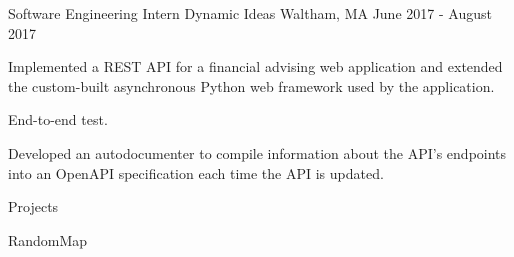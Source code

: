 

\begin{cventries}

  \cventry
    {Software Engineering Intern} %
    {Dynamic Ideas} %
    {Waltham, MA} %
    {June 2017 - August 2017} %
    {
      \begin{cvitems} %
        \item {Implemented a REST API for a financial advising web application
          and extended the custom-built asynchronous Python web framework used
          by the application.}
        \item {End-to-end test.}
        \item {Developed an autodocumenter to compile information about the API's endpoints into an OpenAPI specification each time the API is updated.}
      \end{cvitems}
    }

    \cventry
      {}
      {Projects} 
      {}
      {}
      {
        \begin{cvitems}
          \item {RandomMap}
        \end{cvitems}
      }

\end{cventries}
